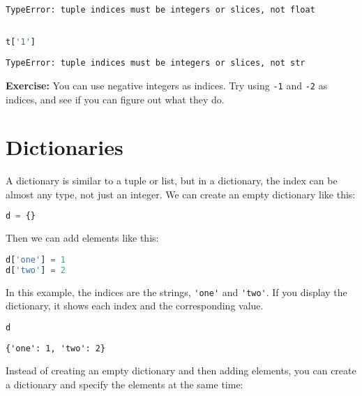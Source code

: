 \begin{lstlisting}[style=output]
TypeError: tuple indices must be integers or slices, not float
\end{lstlisting}

\begin{lstlisting}[language=Python,style=source]
%%expect TypeError

t['1']
\end{lstlisting}

\begin{lstlisting}[style=output]
TypeError: tuple indices must be integers or slices, not str
\end{lstlisting}

\textbf{Exercise:} You can use negative integers as indices. Try using
\passthrough{\lstinline!-1!} and \passthrough{\lstinline!-2!} as
indices, and see if you can figure out what they do.

\section{Dictionaries}\label{dictionaries-1}

A dictionary is similar to a tuple or list, but in a dictionary, the
index can be almost any type, not just an integer. We can create an
empty dictionary like this:

\begin{lstlisting}[language=Python,style=source]
d = {}
\end{lstlisting}

Then we can add elements like this:

\begin{lstlisting}[language=Python,style=source]
d['one'] = 1
d['two'] = 2
\end{lstlisting}

In this example, the indices are the strings,
\passthrough{\lstinline!'one'!} and \passthrough{\lstinline!'two'!}. If
you display the dictionary, it shows each index and the corresponding
value.

\begin{lstlisting}[language=Python,style=source]
d
\end{lstlisting}

\begin{lstlisting}[style=output]
{'one': 1, 'two': 2}
\end{lstlisting}

Instead of creating an empty dictionary and then adding elements, you
can create a dictionary and specify the elements at the same time:

